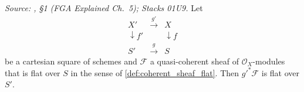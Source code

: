 \begin{lemma}\leanok
  \label{lem:coherent_flat_base_change}
  \textit{Source: \cite{nitsure-hilbert-quot}, \S 1 (FGA Explained Ch.~5); Stacks 01U9.}
  Let
  \[
    \begin{array}{ccc}
      X' & \xrightarrow{\ g'\ } & X \\
      \downarrow f' & & \downarrow f \\
      S' & \xrightarrow{\ g\ } & S
    \end{array}
  \]
  be a cartesian square of schemes and \(\mathcal{F}\) a quasi-coherent sheaf
  of \(\mathcal{O}_X\)-modules that is flat over \(S\) in the sense of
  \cref{def:coherent_sheaf_flat}.  Then \(g'^* \mathcal{F}\) is flat over
  \(S'\).
\end{lemma}
